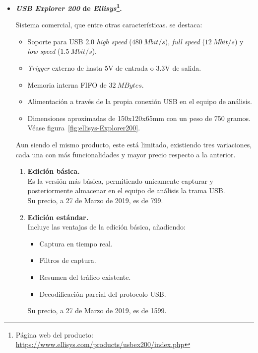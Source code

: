 \begin{itemize}
    \item \textbf{\emph{USB Explorer 200} de \emph{Ellisys}\footnote{Página web del producto: \url{https://www.ellisys.com/products/usbex200/index.php}}.}
    
    Sistema comercial, que entre otras características\cite{ellisys2008}. se destaca:
    \begin{itemize}
        \item Soporte para USB 2.0 \emph{high speed} ($480~Mbit/s$), \emph{full speed} ($12~Mbit/s$) y \emph{low speed} ($1.5~Mbit/s$).
        \item \emph{Trigger} externo de hasta 5V de entrada o 3.3V de salida.
        \item Memoria interna FIFO de $32~MBytes$.
        \item Alimentación a través de la propia conexión USB en el equipo de análisis.
        \item Dimensiones aproximadas de 150x120x65mm con un peso de 750 gramos. Véase figura~\ref{fig:ellisys-Explorer200}.
    \end{itemize}

    Aun siendo el mismo producto, este está limitado, existiendo tres variaciones, cada una con más funcionalidades y mayor precio respecto a la anterior.

    \begin{enumerate}
        \item \textbf{Edición básica.} \\
        Es la versión más básica, permitiendo unicamente capturar y posteriormente almacenar en el equipo de análisis la trama USB. \\
        Su precio, a 27 de Marzo de 2019, es de 799\texteuro.
      
        \item \textbf{Edición estándar.} \\
        Incluye las ventajas de la edición básica, añadiendo:
        \begin{itemize}
            \item Captura en tiempo real.
            \item Filtros de captura.
            \item Resumen del tráfico existente.
            \item Decodificación parcial del protocolo USB.
        \end{itemize}
        Su precio, a 27 de Marzo de 2019, es de 1599\texteuro.
        

\end{enumerate}
\end{itemize}
